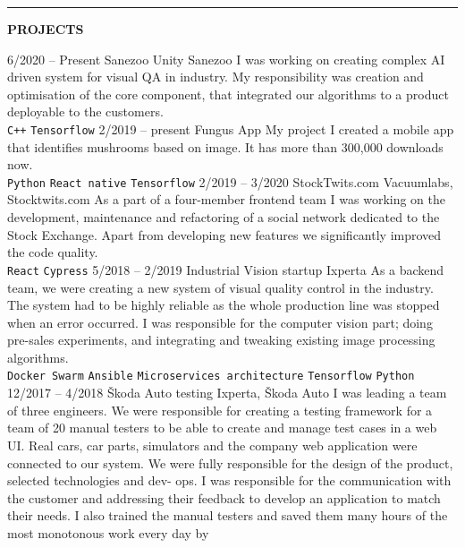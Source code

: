 \documentclass[10pt,A4]{article}
\newcommand{\cvsection}[2] {
\textcolor{sectcol}{\uppercase{\textbf{#1}}}
}
\newcommand{\cvsect}[4]{
	\textcolor{#3}{\hrule}
	\colorbox{#3}{ {\cvsection{#1}{#4}}}
}
\begin{document}
\cvsect{Projects}{0.49}{thirdcol}{textcol}\\[20pt]
\begin{entrylist}
	\entry
		{6/2020 -- Present}
		{Sanezoo Unity}
		{Sanezoo}
		{I was working on creating complex AI driven system for visual QA in industry. 
		My responsibility was creation and optimisation of the core component, that integrated our algorithms to a product deployable to the customers. 
		\\ 
		\texttt{C++}\slashsep
		\texttt{Tensorflow}
		}
	\entry
		{2/2019 -- present}
		{Fungus App}
		{My project}
		{I created a mobile app that identifies mushrooms based on
		image. It has more than 300,000 downloads now.
		\\ 
		\texttt{Python}\slashsep
		\texttt{React native}\slashsep
		\texttt{Tensorflow}}
	\entry
		{2/2019 -- 3/2020}
		{StockTwits.com}
		{Vacuumlabs, Stocktwits.com}
		{As a part of a four-member frontend team I was working on the development, maintenance
		and refactoring of a social network dedicated to the Stock Exchange. Apart from
		developing new features we significantly improved the code quality.  
		\\ 
		\texttt{React}\slashsep
		\texttt{Cypress}}%
	\entry
		{5/2018 -- 2/2019}
		{Industrial Vision startup}
		{Ixperta}
		{As a backend team, we were creating a new system of visual quality control in the
		industry. The system had to be highly reliable as the whole production line was stopped
		when an error occurred. I was responsible for the computer vision part; doing pre-sales
		experiments, and integrating and tweaking existing image processing algorithms.
		\\ 
		\texttt{Docker Swarm}\slashsep
		\texttt{Ansible}\slashsep
		\texttt{Microservices architecture}\slashsep
		\texttt{Tensorflow}\slashsep
		\texttt{Python}}
	\entry
		{12/2017 -- 4/2018}
		{Škoda Auto testing}
		{Ixperta, Škoda Auto}
		{I was leading a team of three engineers. We were responsible for creating a testing
		framework for a team of 20 manual testers to be able to create and manage test cases
		in a web UI. Real cars, car parts, simulators and the company web application were
		connected to our system.
		We were fully responsible for the design of the product, selected technologies and dev-
		ops. I was responsible for the communication with the customer and addressing their
		feedback to develop an application to match their needs. I also trained the manual
		testers and saved them many hours of the most monotonous work every day by
}
\end{entrylist}
\end{document}
